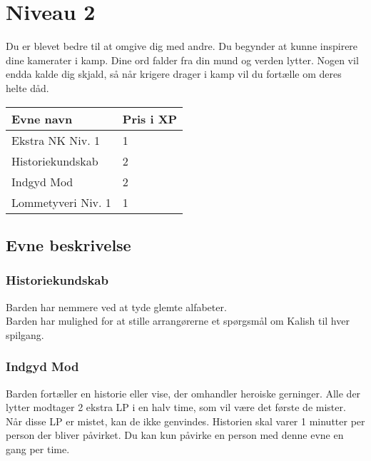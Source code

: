 \chapter*{Niveau 2}
Du er blevet bedre til at omgive dig med andre. Du begynder at kunne inspirere dine kamerater i kamp. Dine ord falder fra din mund og verden lytter. Nogen vil endda kalde dig skjald, så når krigere drager i kamp vil du fortælle om deres helte dåd.
\begin{table}[H]
    \centering
    \begin{tabular}{|p{}|p{}|}
    \rowcolor{cerulean!80}\hline
    Evne navn & Pris i XP \\\hline
       Ekstra NK Niv. 1 & 1 \\\hline
       Historiekundskab & 2 \\\hline
       Indgyd Mod & 2 \\\hline
       Lommetyveri Niv. 1 & 1 \\\hline
    \end{tabular}
\end{table}
\section*{Evne beskrivelse}



\subsection*{Historiekundskab}
Barden har nemmere ved at tyde glemte alfabeter.\\
Barden har mulighed for at stille arrangørerne et spørgsmål om Kalish til hver spilgang.


\subsection*{Indgyd Mod}
Barden fortæller en historie eller vise, der omhandler heroiske gerninger. Alle der lytter modtager 2 ekstra LP i en halv time, som vil være det første de mister. Når disse LP er mistet, kan de ikke genvindes. Historien skal varer 1 minutter per person der bliver påvirket. Du kan kun påvirke en person med denne evne en gang per time.


